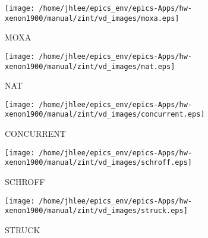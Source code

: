 \noindent
\vspace{0.6cm}
\begin{minipage}{.2\textwidth}
\begin{center}
\texttt{[image: /home/jhlee/epics\_env/epics-Apps/hw-xenon1900/manual/zint/vd\_images/moxa.eps]}
\end{center}
\end{minipage}
\begin{minipage}{.7\textwidth}
MOXA
\end{minipage}


\noindent
\vspace{0.6cm}
\begin{minipage}{.2\textwidth}
\begin{center}
\texttt{[image: /home/jhlee/epics\_env/epics-Apps/hw-xenon1900/manual/zint/vd\_images/nat.eps]}
\end{center}
\end{minipage}
\begin{minipage}{.7\textwidth}
NAT
\end{minipage}


\noindent
\vspace{0.6cm}
\begin{minipage}{.2\textwidth}
\begin{center}
\texttt{[image: /home/jhlee/epics\_env/epics-Apps/hw-xenon1900/manual/zint/vd\_images/concurrent.eps]}
\end{center}
\end{minipage}
\begin{minipage}{.7\textwidth}
CONCURRENT
\end{minipage}


\noindent
\vspace{0.6cm}
\begin{minipage}{.2\textwidth}
\begin{center}
\texttt{[image: /home/jhlee/epics\_env/epics-Apps/hw-xenon1900/manual/zint/vd\_images/schroff.eps]}
\end{center}
\end{minipage}
\begin{minipage}{.7\textwidth}
SCHROFF
\end{minipage}


\noindent
\vspace{0.6cm}
\begin{minipage}{.2\textwidth}
\begin{center}
\texttt{[image: /home/jhlee/epics\_env/epics-Apps/hw-xenon1900/manual/zint/vd\_images/struck.eps]}
\end{center}
\end{minipage}
\begin{minipage}{.7\textwidth}
STRUCK
\end{minipage}



